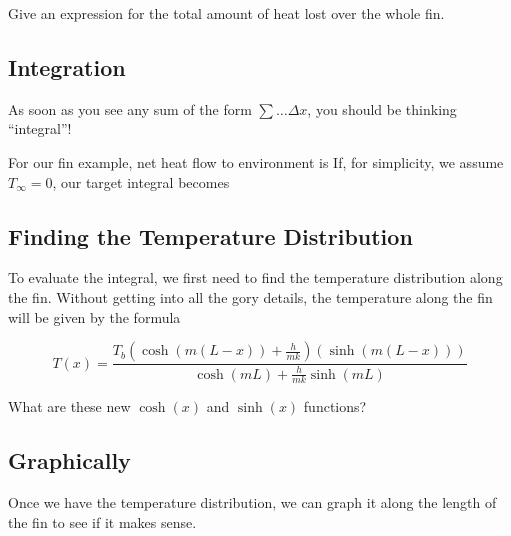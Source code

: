 \vfill

Give an expression for the total amount of heat lost over
  the whole fin.

\vfill
\vfill


\newpage


\subsection*{Integration}

As soon as you see any sum of the form $\sum \ldots \Delta x$, you
should be thinking ``integral''!

For our fin example, net heat flow to environment is
\vfill
If, for simplicity, we assume $T_{\infty} = 0$, our target integral becomes
\vfill

\newpage

\subsection*{Finding the Temperature Distribution}
To evaluate the integral, we first need to find the temperature
distribution along the fin.  Without getting into all the gory
details, the temperature along the fin will be given by the formula

$$T(x) = \frac{T_b \left(\cosh(m(L-x)) + \frac{h}{mk}\right)\left(\sinh(m(L-x))\right)}{\cosh(mL) + \frac{h}{mk} \sinh(mL)}$$

\problem What are these new $\cosh(x)$ and $\sinh(x)$ functions?



\newpage
\subsection*{Graphically}
Once we have the temperature distribution, we can graph it along the
length of the fin to see if it makes sense.

